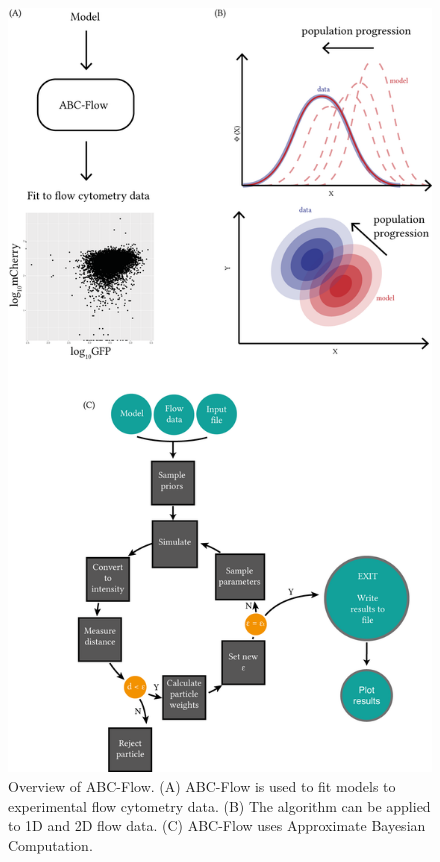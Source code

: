 \begin{figure}[htbp]
	\begin{center}
		\includegraphics[scale=1.1]{../../chapters/chapterABCFlow/images/abc-flow-overv.png}
		\caption[ABC-Flow algorithm overview]{\label{fig:abcflow-overv}Overview of ABC-Flow. (A) ABC-Flow is used to fit models to experimental flow cytometry data. (B) The algorithm can be applied to 1D and 2D flow data. (C) ABC-Flow uses Approximate Bayesian Computation.}
	\end{center}
\end{figure}





